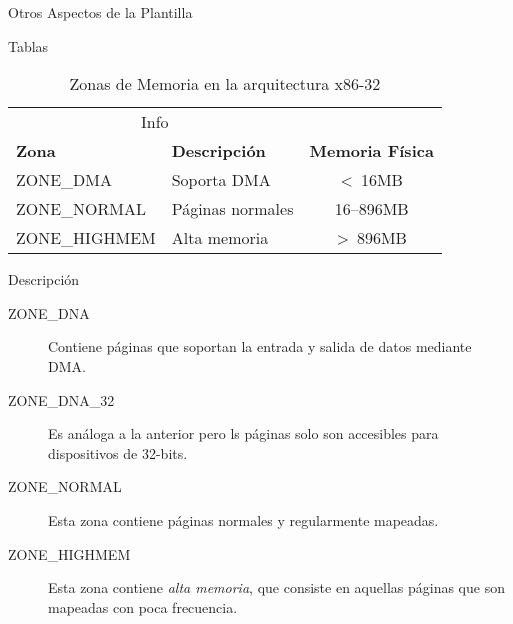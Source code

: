 \documentclass{article}
\theoremstyle{theorem-style}  %
\theoremstyle{definition}
\theoremstyle{example-style}
\begin{document}
\begin{section}{Otros Aspectos de la Plantilla}

\begin{subsection}{Tablas}

\lipsum[1]

\begin{table}[ht]
\caption{Zonas de Memoria en la arquitectura x86-32}
\kern 1mm                                  %
\centering \begin{tabular}{@{}llc@{}}
\toprule
\multicolumn{2}{c}{Info}                                            \\
\cmidrule(r){1-2}
\textbf{Zona} & \textbf{Descripción}   & \textbf{Memoria Física}    \\ 
\midrule
ZONE\_DMA     & Soporta DMA            & \textless \ 16MB           \\ 
ZONE\_NORMAL  & Páginas normales       & 16–896MB                   \\
ZONE\_HIGHMEM & Alta memoria           & \textgreater \ 896MB       \\ 
\bottomrule
\end{tabular}
\label{table:memoria-x86-32}
\end{table}

\end{subsection}

\begin{subsection}{Descripción}

\begin{description}
\item[ZONE\_DNA] Contiene páginas que soportan la entrada y salida de datos mediante DMA.
\item[ZONE\_DNA\_32] Es análoga a la anterior pero ls páginas solo son accesibles para
dispositivos de 32-bits.
\item[ZONE\_NORMAL] Esta zona contiene páginas normales y regularmente mapeadas.
\item[ZONE\_HIGHMEM] Esta zona contiene \textit{alta memoria}, que consiste en
 aquellas páginas que son mapeadas con poca frecuencia.
\end{description}

\end{subsection}

\pagebreak

\end{section}
\end{document}
